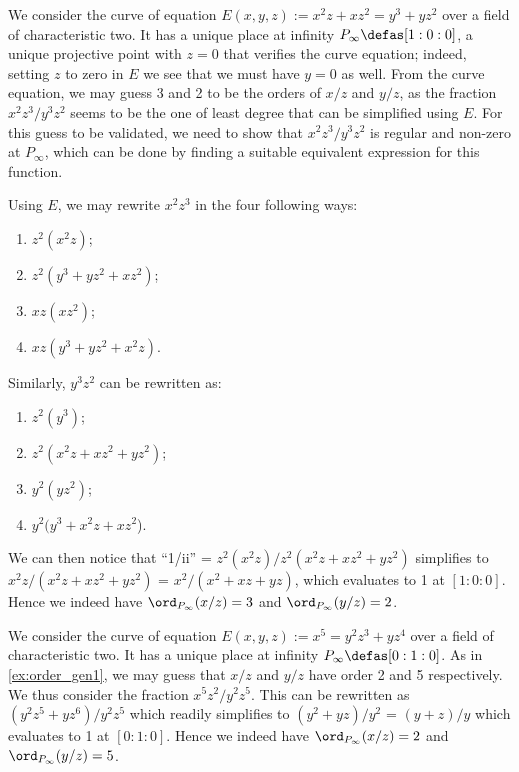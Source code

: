 \begin{example}[$x^2z + xz^2 = y^3+yz^2$]
\label{ex:order_gen1}
We consider the curve of equation $E(x,y,z) := x^2z + xz^2 = y^3+yz^2$ over a field of characteristic two. It has a unique place at infinity $P_\infty \defas [1:0:0]$,
\ie a unique projective point with $z = 0$ that verifies the curve equation; indeed, setting $z$ to zero in $E$ we see that we must have $y = 0$ as well.
From the curve equation, we may guess 3 and 2 to be the orders of $x/z$ and $y/z$, as the fraction $x^2z^3/y^3z^2$ seems to be the one of least degree
that can be simplified using $E$. For this guess to be validated, we need to show that $x^2z^3/y^3z^2$ is regular and non-zero at $P_\infty$, which can be done
by finding a suitable equivalent expression for this function.

Using $E$, we may rewrite $x^2z^3$ in the four following ways:
\begin{enumerate}
\item $z^2(x^2z)$;
\item $z^2(y^3 + yz^2 + xz^2)$;
\item $xz(xz^2)$;
\item $xz(y^3 + yz^2 + x^2z)$.
\end{enumerate}
Similarly, $y^3z^2$ can be rewritten as:
\renewcommand{\theenumi}{\roman{enumi}}
\begin{enumerate}
\item $z^2(y^3)$;
\item $z^2(x^2z + xz^2 + yz^2)$;
\item $y^2(yz^2)$;
\item $y^2(y^3 + x^2z + xz^2$).
\end{enumerate}
We can then notice that ``1/ii'' = $z^2(x^2z)/z^2(x^2z + xz^2 + yz^2)$ simplifies to $x^2z/(x^2z + xz^2 + yz^2)$ = $x^2/(x^2 + xz + yz)$,
which evaluates to 1 at $[1:0:0]$. Hence we indeed have $\ord_{P_\infty}(x/z) = 3$ and $\ord_{P_\infty}(y/z) = 2$.
\end{example}

\begin{example}[$x^5 = y^2z^3 + yz^4$]
\label{ex:order_gen2}
We consider the curve of equation $E(x,y,z) := x^5 = y^2z^3 + yz^4$ over a field of characteristic two. It has a unique place at infinity $P_\infty \defas [0:1:0]$.
As in \autoref{ex:order_gen1}, we may guess that $x/z$ and $y/z$ have order 2 and 5 respectively. We thus consider the fraction $x^5z^2/y^2z^5$.
This can be rewritten as $(y^2z^5 + yz^6)/y^2z^5$ which readily simplifies to $(y^2 +yz)/y^2$ = $(y+z)/y$ which evaluates to 1 at $[0:1:0]$.
Hence we indeed have $\ord_{P_\infty}(x/z) = 2$ and $\ord_{P_\infty}(y/z) = 5$.
\end{example}

